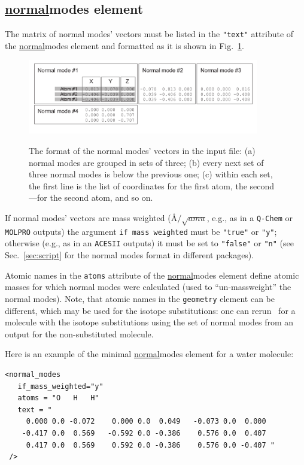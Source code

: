 \documentclass[11pt]{article}
\begin{document}
\subsection{\ul{normal}{modes} element}
\label{sec:nmodes}

The matrix of normal modes' vectors must be listed in the {\tt "text"} attribute of the \ul{normal}{modes} element and
formatted as it is shown in Fig.~\ref{fig:nm_format}.
\begin{figure}[h!]
  \centering
  \caption{The format of the normal modes' vectors in the input file:
(a) normal modes are grouped in sets of three; 
(b) every next set of three normal modes is below the previous one; 
(c) within each set, the first line is the list of coordinates for the first atom, 
the second---for the second atom, and so on.}
  \includegraphics[width=0.9\textwidth]{nm_format.pdf}
  \label{fig:nm_format}
\end{figure}

If normal modes' vectors are mass weighted 
(\AA$/\sqrt{amu}$, e.g., as in a {\tt Q-Chem} or {\tt MOLPRO} outputs) the argument 
{\tt if mass weighted} must be {\tt "true"} or {\tt "y"}; 
otherwise (e.g., as in an {\tt ACESII} outputs) it must be set to {\tt "false"} or {\tt "n"}
(see Sec.~\ref{sec:script} for the normal modes format in different \ai packages).

Atomic names in the {\tt atoms} attribute of the \ul{normal}{modes} element 
define atomic masses for which normal modes were calculated (used to ``un-massweight'' the normal modes).
Note, that atomic names in the {\tt geometry} element can be different,
which may be used for the isotope substitutions: one can rerun \ezFCF\ for a molecule with
the isotope substitutions using the set of normal modes from an \ai output for the non-substituted molecule.

Here is an example of the minimal \ul{normal}{modes} element for a water molecule:
\begin{lstlisting}[frame=single,framerule=0pt]
<normal_modes
   if_mass_weighted="y"
   atoms = "O   H   H"
   text = "
     0.000 0.0 -0.072    0.000 0.0  0.049   -0.073 0.0  0.000
    -0.417 0.0  0.569   -0.592 0.0 -0.386    0.576 0.0  0.407
     0.417 0.0  0.569    0.592 0.0 -0.386    0.576 0.0 -0.407 "
 />
\end{lstlisting}
\end{document}
